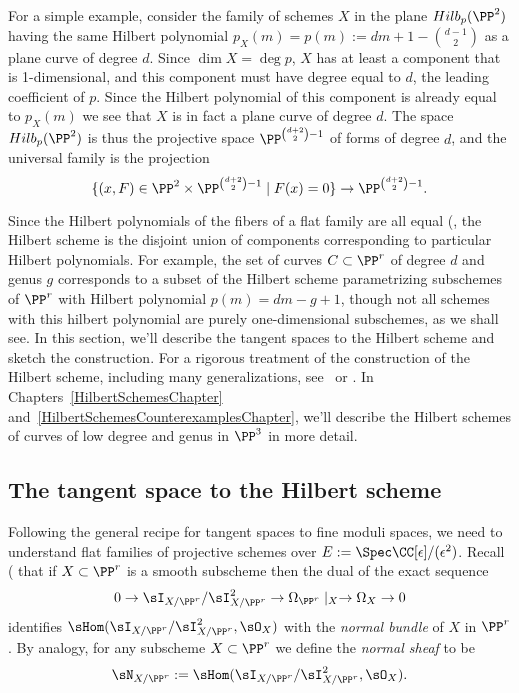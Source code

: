\begin{example}\label{Hilb for plane curves}
 For a simple example, consider the family of schemes $X$ in the plane
$Hilb_p(\PP^2)$
having the same Hilbert polynomial $p_X(m)  = p(m) := dm+1-{d-1\choose 2}$ as a plane curve of degree $d$. Since 
$\dim X = \deg p$, $X$ has at least a component that is 1-dimensional, and this component must have degree
equal to $d$, the leading coefficient of $p$. Since the Hilbert polynomial  of this component is already equal
to $p_X(m)$ we see that $X$ is in fact a plane curve of degree $d$. The space $Hilb_{p}(\PP^2)$ is thus the projective space $\PP^{{d+2\choose 2}-1}$ of forms of degree $d$,
and the universal family is the projection 
$$
\{(x,F) \in \PP^2 \times \PP^{{d+2\choose 2}-1} \mid F(x) = 0\} \to \PP^{{d+2\choose 2}-1}.
$$
\end{example}
 
Since the Hilbert polynomials of the fibers of a flat family are all equal (\cite[Section III.9]{Hartshorne1977}, the Hilbert scheme is the disjoint union of components corresponding to particular Hilbert polynomials. For example, the set of curves $C \subset \PP^r$ of degree $d$ and genus $g$ corresponds to a subset of the Hilbert scheme parametrizing subschemes of $\PP^r$ with Hilbert polynomial $p(m) = dm - g + 1$, though not all schemes with this hilbert polynomial are purely one-dimensional subschemes, as we shall see. In this section, we'll describe
 the tangent spaces to the Hilbert scheme and sketch the construction. For a rigorous treatment of the construction of the Hilbert scheme, including many generalizations,  see~\cite{HomogHilbert} or \cite{MR2222646}. In Chapters~\ref{HilbertSchemesChapter} and~\ref{HilbertSchemesCounterexamplesChapter}, we'll describe  the Hilbert schemes of curves of low degree and genus in $\PP^3$ in more detail. 

\subsection{The tangent space to the Hilbert scheme}\label{tan hilbert section}

Following the general recipe for tangent spaces to fine moduli spaces, we need to understand flat families
of projective schemes over $E := \Spec \CC[\eps]/(\eps^2)$. Recall (\cite[****]{Hartshorne1977} that if $X\subset \PP^r$ is a smooth subscheme then
the dual of the exact sequence
$$
0\to \sI_{X/\PP^r}/\sI_{X/\PP^r}^2 \to \Omega_{\PP^r}\mid_X \to \Omega_X \to 0
$$
identifies $\sHom(\sI_{X/\PP^r}/\sI_{X/\PP^r}^2, \sO_X)$ with the \emph{normal bundle} of $X$ in $\PP^r$.
By analogy, for any subscheme $X\subset \PP^r$ we define the \emph{normal sheaf} to be
$$
\sN_{X/\PP^r} := \sHom(\sI_{X/\PP^r}/\sI_{X/\PP^r}^2, \sO_X).
$$

